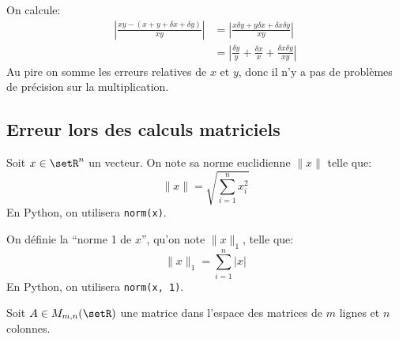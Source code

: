 \documentclass[a4paper,10pt,french,openany]{memoir}
\newcommand{\norm}[1]{\lVert#1\rVert}
\newcommand{\normo}[1]{\norm{#1}_1}
\begin{document}
On calcule:
\begin{align*}
 \left|\frac{x y - (x+y+\delta x+\delta y)}{x y}\right| & = \left|\frac{x\delta y + y\delta x + \delta x\delta y}{x y}\right| \\
 & = \left|\frac{\delta y}y + \frac{\delta x}x + \frac{\delta x\delta y}{xy}\right|
\end{align*}
Au pire on somme les erreurs relatives de $x$ et $y$, donc il n'y a pas de problèmes de précision sur la multiplication.

\subsection{Erreur lors des calculs matriciels}

Soit $x\in \setR^n$ un vecteur. On note sa norme euclidienne $\norm{x}$ telle que:
\[ \norm{x} = \sqrt{\sum_{i=1}^n x_i^2} \]
En Python, on utilisera \lstinline{norm(x)}.

On définie la ``norme 1 de $x$'', qu'on note $\normo{x}$, telle que:
\[ \normo x = \sum_{i=1}^n \left|x\right| \]
En Python, on utilisera \lstinline{norm(x, 1)}.

Soit $A \in M_{m,n}(\setR)$ une matrice dans l'espace des matrices de $m$ lignes et $n$ colonnes.
\end{document}

